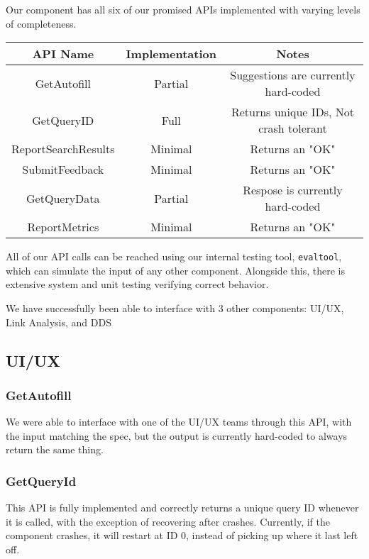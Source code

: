Our component has all six of our promised APIs implemented with varying levels of completeness.

\begin{center}
    \begin{tabular}{ |c|c|c| } 
     \hline
     API Name & Implementation & Notes \\
     \hline \hline
     GetAutofill & Partial & Suggestions are currently hard-coded \\
     GetQueryID & Full & Returns unique IDs, Not crash tolerant \\
     ReportSearchResults & Minimal & Returns an "OK" \\
     SubmitFeedback & Minimal & Returns an "OK" \\
     GetQueryData & Partial & Respose is currently hard-coded \\
     ReportMetrics & Minimal & Returns an "OK" \\
     \hline
    \end{tabular}
\end{center}

All of our API calls can be reached using our internal testing tool, \verb|evaltool|, which can simulate the input of any other component. Alongside this, there is extensive system and unit testing verifying correct behavior.

\medskip

We have successfully been able to interface with 3 other components: UI/UX, Link Analysis, and DDS

\subsection*{UI/UX}

\subsubsection*{GetAutofill}

We were able to interface with one of the UI/UX teams through this API, with the input matching the spec, but the output is currently hard-coded to always return the same thing.

\subsubsection*{GetQueryId}

This API is fully implemented and correctly returns a unique query ID whenever it is called, with the exception of recovering after crashes. Currently, if the component crashes, it will restart at ID 0, instead of picking up where it last left off.

